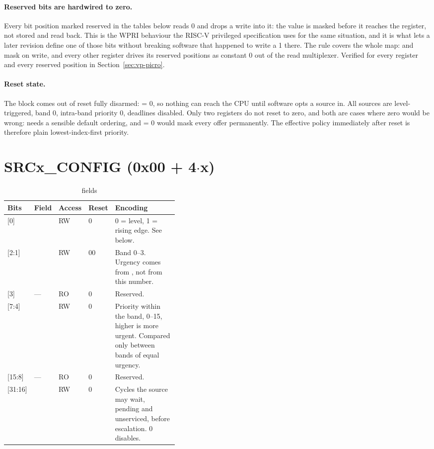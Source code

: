 \paragraph{Reserved bits are hardwired to zero.} Every bit position marked
reserved in the tables below reads 0 and drops a write into it: the value is
masked before it reaches the register, not stored and read back. This is the
WPRI behaviour the RISC-V privileged specification uses for the same situation,
and it is what lets a later revision define one of those bits without breaking
software that happened to write a 1 there. The rule covers the whole map:
 and  mask on write, and every other
register drives its reserved positions as constant 0 out of the read multiplexer.
Verified for every register and every reserved position in
Section~\ref{sec:vp-picro}.

\paragraph{Reset state.} The block comes out of reset fully disarmed:
 = 0, so nothing can reach the CPU until software opts a source
in. All sources are level-triggered, band 0, intra-band priority 0, deadlines
disabled. Only two registers do not reset to zero, and both are cases where zero
would be wrong:  needs a sensible default ordering, and
 = 0 would mask every offer permanently. The effective policy
immediately after reset is therefore plain lowest-index-first priority.

\section{SRCx\_CONFIG (0x00 + 4$\cdot$x)}

\begin{table}[H]
\centering
\caption{ fields}
\label{tab:srccfg}
\begin{tabular}{@{}llllL{0.40\linewidth}@{}}
\toprule
\textbf{Bits} & \textbf{Field} & \textbf{Access} & \textbf{Reset} & \textbf{Encoding} \\
\midrule
{[0]}      &      & RW & 0 & 0 = level, 1 = rising edge. See below. \\
{[2:1]}  &      & RW & 00 & Band 0--3. Urgency comes from , not from this number. \\
{[3]}    & ---            & RO & 0 & Reserved. \\
{[7:4]}  &     & RW & 0 & Priority within the band, 0--15, higher is more urgent. Compared only between bands of equal urgency. \\
{[15:8]} & ---            & RO & 0 & Reserved. \\
{[31:16]}&  & RW & 0 & Cycles the source may wait, pending and unserviced, before escalation. 0 disables. \\
\bottomrule
\end{tabular}
\end{table}

